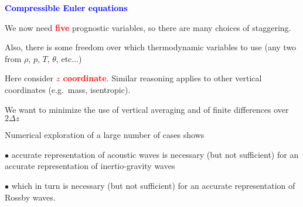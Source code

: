 \documentclass[a4]{seminar}
\newcommand{\R}[1]{\textcolor{red}{#1}}
\newcommand{\B}[1]{\textcolor{blue}{#1}}
\begin{document}

\begin{slide}

\B{\bf Compressible Euler equations}

\vspace{3mm}

We now need \R{\bf five} prognostic variables, so there are many
choices of staggering.

Also, there is some freedom over which
thermodynamic variables to use (any two from
\( \rho \), \( p \), \( T \), \( \theta \), etc...)

\vspace{4mm}

Here consider \R{\bf \( z \) coordinate}. Similar reasoning applies to
other vertical coordinates (e.g.\ mass, isentropic).



\end{slide}


\begin{slide}

We want to minimize the use of vertical averaging and of
finite differences over \( 2 \Delta z \)

\vspace{3mm}

Numerical exploration of a large number of cases shows

\vspace{4mm}

\( \bullet \) accurate representation of acoustic waves is necessary
(but not sufficient) for an accurate representation of inertio-gravity
waves

\vspace{4mm}

\( \bullet \) which in turn is necessary (but not sufficient) for
an accurate representation of Rossby waves.


\end{slide}

\end{document}
